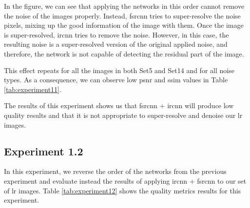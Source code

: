 In the figure, we can see that applying the networks in this order cannot remove the noise of the images properly. Instead, \gls{fsrcnn} tries to super-resolve the noise pixels, mixing up the good information of the image with them. Once the image is super-resolved, \gls{ircnn} tries to remove the noise. However, in this case, the resulting noise is a super-resolved version of the original applied noise, and therefore, the network is not capable of detecting the residual part of the image.

This effect repeats for all the images in both Set5 and Set14 and for all noise types. As a consequence, we can observe low \gls{psnr} and \gls{ssim} values in Table \ref{tab:experiment11}.

The results of this experiment shows us that \gls{fsrcnn} $+$ \gls{ircnn} will produce low quality results and that it is not appropriate to super-resolve and denoise our \gls{lr} images.

\subsection{Experiment 1.2}
In this experiment, we reverse the order of the networks from the previous experiment and evaluate instead the results of applying \gls{ircnn} $+$ \gls{fsrcnn} to our set of \gls{lr} images. Table \ref{tab:experiment12} shows the quality metrics results for this experiment. 

